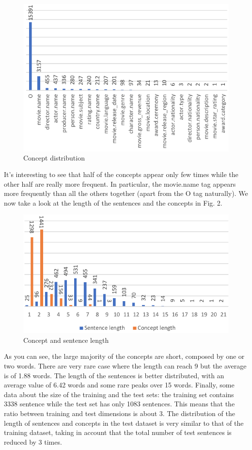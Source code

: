 \documentclass[11pt,a4paper]{article}
\begin{document}
\begin{figure}
  \includegraphics[scale=0.35]{concept_table.jpg}
  \caption{Concept distribution}
\end{figure}
It's interesting to see that half of the concepts appear only few times while the other half are really more frequent. In particular, the movie.name tag appears more frequently than all the others together (apart from the O tag naturally). We now take a look at the length of the sentences and the concepts in Fig. 2.
\begin{figure}
  \includegraphics[scale=0.33]{length.png}
  \caption{Concept and sentence length}
\end{figure}
As you can see, the large majority of the concepts are short, composed by one or two words. There are very rare case where the length can reach 9 but the average is of 1.88 words. The length of the sentences is better distributed, with an average value of 6.42 words and some rare peaks over 15 words. Finally, some data about the size of the training and the test sets: the training set contains 3338 sentence while the test set has only 1083 sentences. This means that the ratio between training and test dimensions is about 3. The distribution of the length of sentences and concepts in the test dataset is very similar to that of the training dataset, taking in account that the total number of test sentences is reduced by 3 times.
\end{document}
